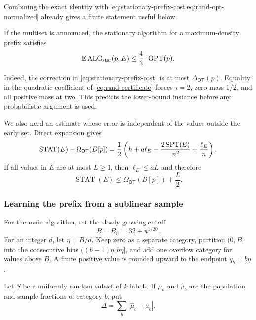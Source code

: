 Combining the exact identity with
\cref{eq:stationary-prefix-cost,eq:rand-opt-normalized} already gives a finite
statement useful below.

\begin{corollary}
\label{cor:rand-announced-four-thirds}
If the multiset is announced, the stationary algorithm for a maximum-density
prefix satisfies
\[
 \mathbb{E}\operatorname{ALG}_{\mathrm{stat}}(p,E)\le\frac43\cdot\operatorname{OPT}(p).
\]
\end{corollary}

Indeed, the correction in \cref{eq:stationary-prefix-cost} is at most
$\Delta_{\mathsf{OT}}(p)$.
Equality in the quadratic coefficient of \cref{eq:rand-certificate} forces
$\tau=2$, zero mass $1/2$, and all positive mass at two.  This predicts the
lower-bound instance before any probabilistic argument is used.

We also need an estimate whose error is independent of the values outside
the early set.  Direct expansion gives
\begin{equation}
 \operatorname{STAT}(E)-\Omega_{\mathsf{OT}}(D[p])
 =\frac12\left(
 h+a\ell_E-\frac{2\operatorname{SPT}(E)}{n^2}+\frac{\ell_E}{n}\right).
 \label{eq:rand-crude-identity}
\end{equation}
If all values in $E$ are at most $L\ge1$, then $\ell_E\le aL$ and therefore
\begin{equation}
 \operatorname{STAT}(E)\le \Omega_{\mathsf{OT}}(D[p])+\frac L2.
 \label{eq:rand-bounded-early}
\end{equation}

\subsubsection{Learning the prefix from a sublinear sample}

For the main algorithm, set the slowly growing cutoff
\begin{equation}
 B=B_n=32+n^{1/20}.
 \label{eq:rand-cutoff}
\end{equation}
For an integer $d$, let $\eta=B/d$.  Keep zero as a separate category,
partition $(0,B]$ into the consecutive bins
$((b-1)\eta,b\eta]$, and add one overflow category for values above $B$.
A finite positive value is rounded upward to the endpoint $q_b=b\eta$.

Let $S$ be a uniformly random subset of $k$ labels.  If $\mu_b$ and
$\widehat\mu_b$ are the population and sample fractions of category $b$, put
\begin{equation}
 \Delta=\sum_b|\widehat\mu_b-\mu_b|.
 \label{eq:rand-hist-error}
\end{equation}


